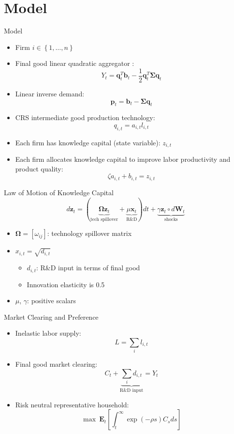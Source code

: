 \documentclass[
  10pt,               %
  aspectratio=169,    %
  handout             %
]{beamer}
\theoremstyle{plain}
\begin{document}
\section{Model}
\begin{frame}{Model}

  \begin{itemize}
    \item Firm $i\in \left\{1,\ldots, n\right\}$ \pause
    \item Final good linear quadratic aggregator \citep{Pellegrino2024-dn,Ederer2024-rw}:
          \[
            Y_{t}=\bm{q}_{t}^{T}\bm{b}_{t}-\frac{1}{2}\bm{q}_{t}^{T}\bm{\Sigma}\bm{q}_{t}
          \]\pause
    \item Linear inverse demand:
          \[
            \bm{p}_{t}=\bm{b}_{t}-\bm{\Sigma}\bm{q}_{t}
          \]\pause
    \item CRS intermediate good production technology: \[q_{i,t}=a_{i,t}l_{i,t}\]\pause
    \item Each firm has knowledge capital (state variable): $z_{i,t}$\medskip{}\pause
    \item Each firm allocates knowledge capital to improve labor productivity
          and product quality:
          \[
            \zeta a_{i,t}+b_{i,t}=z_{i,t}
          \]
  \end{itemize}
\end{frame}
%
\begin{frame}{Law of Motion of Knowledge Capital}
  \[
    d\bm{z}_{t}=\left(\underbrace{\bm{\Omega}\bm{z}_{t}}_{\text{tech spillover}}+\underbrace{\mu\bm{x}_{t}}_{\text{R\&D}}\right)dt+\underbrace{\gamma\bm{z}_{t} \circ d\bm{W}_{t}}_{\text{shocks}}
  \]
  \begin{itemize}
    \item $\bm{\Omega}=\left[\omega_{ij}\right]$: technology spillover matrix\medskip{}
    \item $x_{i,t}=\sqrt{d_{i,t}}$
          \begin{itemize}
            \item $d_{i,t}$: R\&D input in terms of final good
            \item Innovation elasticity is 0.5\medskip{}
          \end{itemize}
    \item $\mu$, $\gamma$: positive scalars
  \end{itemize}
\end{frame}
%
\begin{frame}{Market Clearing and Preference}
  \begin{itemize}
    \item Inelastic labor supply:
          \[
            L=\sum_{i}l_{i,t}
          \]
    \item Final good market clearing:
          \[
            C_{t}+\underbrace{\sum_{i}d_{i,t}}_{\text{R\&D input}}=Y_{t}
          \]
    \item Risk neutral representative household:
          \[
            \max\ \bm{E}_{t}\left[\int_{t}^{\infty}\exp\left(-\rho s\right)C_{s}ds\right]
          \]
  \end{itemize}
\end{frame}
\end{document}
